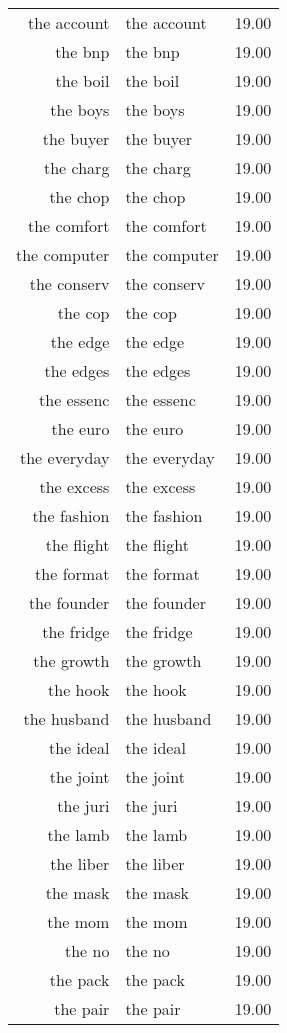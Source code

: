 \begin{table}[ht]
\begin{tabular}{rlr}
  the account & the account & 19.00 \\ 
  the bnp & the bnp & 19.00 \\ 
  the boil & the boil & 19.00 \\ 
  the boys & the boys & 19.00 \\ 
  the buyer & the buyer & 19.00 \\ 
  the charg & the charg & 19.00 \\ 
  the chop & the chop & 19.00 \\ 
  the comfort & the comfort & 19.00 \\ 
  the computer & the computer & 19.00 \\ 
  the conserv & the conserv & 19.00 \\ 
  the cop & the cop & 19.00 \\ 
  the edge & the edge & 19.00 \\ 
  the edges & the edges & 19.00 \\ 
  the essenc & the essenc & 19.00 \\ 
  the euro & the euro & 19.00 \\ 
  the everyday & the everyday & 19.00 \\ 
  the excess & the excess & 19.00 \\ 
  the fashion & the fashion & 19.00 \\ 
  the flight & the flight & 19.00 \\ 
  the format & the format & 19.00 \\ 
  the founder & the founder & 19.00 \\ 
  the fridge & the fridge & 19.00 \\ 
  the growth & the growth & 19.00 \\ 
  the hook & the hook & 19.00 \\ 
  the husband & the husband & 19.00 \\ 
  the ideal & the ideal & 19.00 \\ 
  the joint & the joint & 19.00 \\ 
  the juri & the juri & 19.00 \\ 
  the lamb & the lamb & 19.00 \\ 
  the liber & the liber & 19.00 \\ 
  the mask & the mask & 19.00 \\ 
  the mom & the mom & 19.00 \\ 
  the no & the no & 19.00 \\ 
  the pack & the pack & 19.00 \\ 
  the pair & the pair & 19.00 \\ 

\end{tabular}
\end{table}
